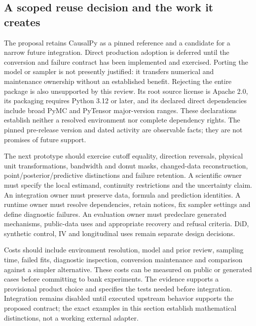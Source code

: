 \subsection{A scoped reuse decision and the work it creates}

The proposal retains CausalPy as a pinned reference and a candidate for a narrow
future integration. Direct production adoption is deferred until the conversion
and failure contract has been implemented and exercised. Porting the model or
sampler is not presently justified: it transfers numerical and maintenance
ownership without an established benefit. Rejecting the entire package is also
unsupported by this review. Its root source license is Apache 2.0, its packaging
requires Python 3.12 or later, and its declared direct dependencies include broad
PyMC and PyTensor major-version ranges. These declarations establish neither a
resolved environment nor complete dependency rights. The pinned pre-release
version and dated activity are observable facts; they are not promises of future
support.~\citep{exec14_causalpy_primary,exec14_causalpy_decision}

The next prototype should exercise cutoff equality, direction reversals, physical
unit transformations, bandwidth and donut masks, changed-data reconstruction,
point/posterior/predictive distinctions and failure retention. A scientific owner
must specify the local estimand, continuity restrictions and the uncertainty
claim. An integration owner must preserve data, formula and prediction identities.
A runtime owner must resolve dependencies, retain notices, fix sampler settings
and define diagnostic failures. An evaluation owner must predeclare generated
mechanisms, public-data uses and appropriate recovery and refusal criteria.
DiD, synthetic control, IV and longitudinal uses remain separate design decisions.
\citep{exec14_causalpy_decision}

Costs should include environment resolution, model and prior review, sampling
time, failed fits, diagnostic inspection, conversion maintenance and comparison
against a simpler alternative. These costs can be measured on public or generated
cases before committing to bank experiments. The evidence supports a provisional product choice and specifies the tests needed before integration. Integration
remains disabled until executed upstream behavior supports the proposed contract;
the exact examples in this section establish mathematical distinctions, not a
working external adapter.~\citep{exec14_causalpy_decision}
\label{exec14:causalpy-contract-end}


